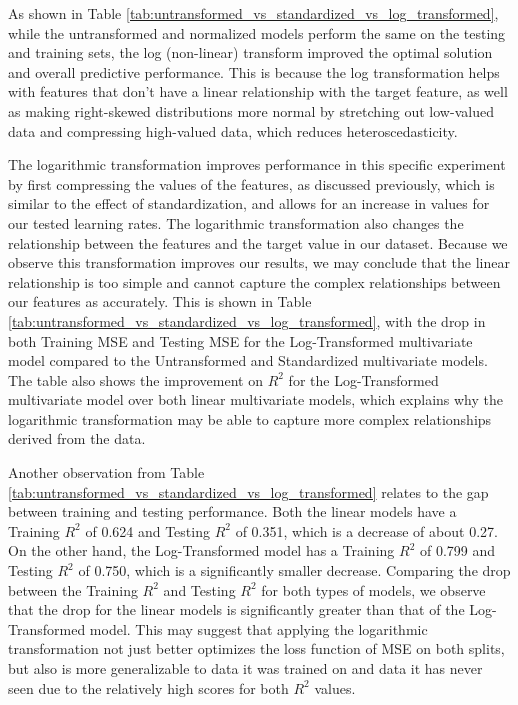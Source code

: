 \documentclass[12pt,letterpaper]{article}
\begin{document}
As shown in Table \ref{tab:untransformed_vs_standardized_vs_log_transformed}, while the untransformed and normalized models perform the same on the testing and training sets, the log (non-linear) transform improved the optimal solution and overall predictive performance. This is because the log transformation helps with features that don't have a linear relationship with the target feature, as well as making right-skewed distributions more normal by stretching out low-valued data and compressing high-valued data, which reduces heteroscedasticity.

The logarithmic transformation improves performance in this specific experiment by first compressing the values of the features, as discussed previously, which is similar to the effect of standardization, and allows for an increase in values for our tested learning rates. The logarithmic transformation also changes the relationship between the features and the target value in our dataset. Because we observe this transformation improves our results, we may conclude that the linear relationship is too simple and cannot capture the complex relationships between our features as accurately. This is shown in Table \ref{tab:untransformed_vs_standardized_vs_log_transformed}, with the drop in both Training MSE and Testing MSE for the Log-Transformed multivariate model compared to the Untransformed and Standardized multivariate models. The table also shows the improvement on $R^2$ for the Log-Transformed multivariate model over both linear multivariate models, which explains why the logarithmic transformation may be able to capture more complex relationships derived from the data.

Another observation from Table \ref{tab:untransformed_vs_standardized_vs_log_transformed} relates to the gap between training and testing performance. Both the linear models have a Training $R^2$ of 0.624 and Testing $R^2$ of 0.351, which is a decrease of about 0.27. On the other hand, the Log-Transformed model has a Training $R^2$ of 0.799 and Testing $R^2$ of 0.750, which is a significantly smaller decrease. Comparing the drop between the Training $R^2$ and Testing $R^2$ for both types of models, we observe that the drop for the linear models is significantly greater than that of the Log-Transformed model. This may suggest that applying the logarithmic transformation not just better optimizes the loss function of MSE on both splits, but also is more generalizable to data it was trained on and data it has never seen due to the relatively high scores for both $R^2$ values.
\end{document}
